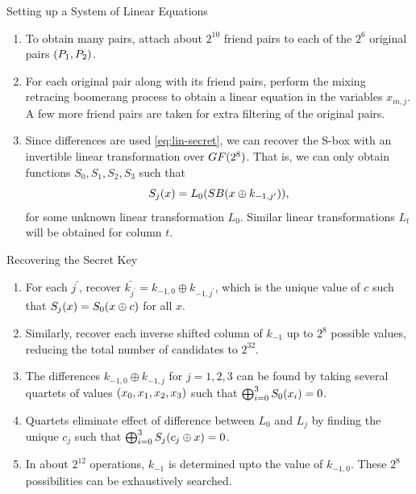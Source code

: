 \documentclass[notheorems]{beamer}
\theoremstyle{definition}
\theoremstyle{example}
\begin{document}
    \begin{frame}[<+->]{Setting up a System of Linear Equations}
        \begin{enumerate}
            \conti
            \item To obtain many pairs, attach about \(2^{10}\) friend pairs to
            each of the \(2^6\) original pairs \((P_1, P_2)\).
            \item For each original pair along with its friend pairs, perform
            the mixing retracing boomerang process to obtain a linear equation
            in the variables \(x_{m, j}\). A few more friend pairs are taken for
            extra filtering of the original pairs.
            \item Since differences are used \eqref{eq:lin-secret}, we can
            recover the S-box with an invertible linear transformation over
            \(GF(2^8)\). That is, we can only obtain functions \(S_0, S_1,
            S_2, S_3\) such that
            \begin{equation}
                S_j(x) = L_0(SB(x \oplus k_{-1, j^\prime})),
            \end{equation}
            for some unknown linear transformation \(L_0\). Similar linear
            transformations \(L_t\) will be obtained for column \(t\).
        \end{enumerate}    
    \end{frame}

    \begin{frame}[<+->]{Recovering the Secret Key}
        \begin{enumerate}
            \item For each \(j^\prime\), recover \(\bar{k_{j^\prime}} = k_{-1,
            0} \oplus k_{-1, {j^\prime}}\), which is the unique value of \(c\)
            such that \(S_j(x) = S_0(x \oplus c)\) for all \(x\).
            \item Similarly, recover each inverse shifted column of \(k_{-1}\)
            up to \(2^8\) possible values, reducing the total number of
            candidates to \(2^{32}\).
            \item The differences \(k_{-1, 0} \oplus k_{-1, j}\) for \(j = 1, 2,
            3\) can be found by taking several quartets of values \((x_0,
            x_1, x_2, x_3)\) such that \(\bigoplus_{i=0}^3S_0(x_i) = 0\).
            \item Quartets eliminate effect of difference between \(L_0\) and
            \(L_j\) by finding the unique \(c_j\) such that \(\bigoplus_{i=0}^3
            S_j(c_j \oplus x) = 0\).
            \item In about \(2^{12}\) operations, \(k_{-1}\) is determined upto
            the value of \(k_{-1, 0}\). These \(2^8\) possibilities can be
            exhaustively searched.
        \end{enumerate}
    \end{frame}
\end{document}
